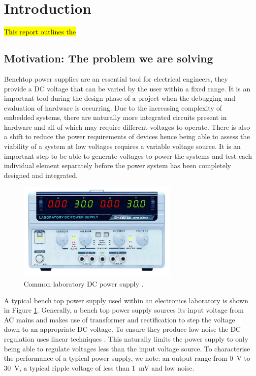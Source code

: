 \section{Introduction}
\hl{This report outlines the}
\subsection{Motivation: The problem we are solving}\label{sec:problem}
Benchtop power supplies are an essential tool for electrical engineers, they provide a DC voltage that can be varied by the user within a fixed range. It is an important tool during the design phase of a project when the debugging and evaluation of hardware is occurring. Due to the increasing complexity of embedded systems, there are naturally more integrated circuits present in hardware and all of which may require different voltages to operate. There is also a shift to reduce the power requirements of devices hence being able to assess the viability of a system at low voltages requires a variable voltage source. It is an important step to be able to generate voltages to power the systems and test each individual element separately before the power system has been completely designed and integrated. 
\begin{figure}
    \centering
    \includegraphics[width=0.7\textwidth]{figures/intro/bench_supply.png}
    \caption{Common laboratory DC power supply \cite{labsupply_price}.}
    \label{fig:bench_supply}
\end{figure}
A typical bench top power supply used within an electronics laboratory is shown in Figure \ref{fig:bench_supply}. Generally, a bench top power supply sources its input voltage from AC mains and makes use of transformer and rectification to step the voltage down to an appropriate DC voltage. To ensure they produce low noise the DC regulation uses linear techniques \cite{benchsupply_specs}. This naturally limits the power supply to only being able to regulate voltages less than the input voltage source. To characterise the performance of a typical power supply, we note: an output range from \SI{0}{V} to \SI{30}{V}, a typical ripple voltage of less than \SI{1}{mV} and low noise. \cite{benchsupply_specs}
